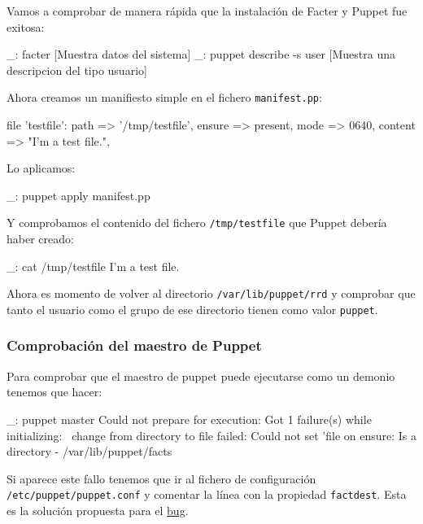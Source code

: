 Vamos a comprobar de manera rápida que la instalación de Facter y Puppet fue exitosa:

\begin{bashcode}
_: facter
[Muestra datos del sistema]
_: puppet describe -s user
[Muestra una descripcion del tipo usuario]
\end{bashcode}

Ahora creamos un manifiesto simple en el fichero \texttt{manifest.pp}:

\begin{rubycode}
file {'testfile':
  path    => '/tmp/testfile',
  ensure  => present,
  mode    => 0640,
  content => "I'm a test file.",
}
\end{rubycode}

Lo aplicamos:

\begin{bashcode}
_: puppet apply manifest.pp
\end{bashcode}

Y comprobamos el contenido del fichero \texttt{/tmp/testfile} que Puppet debería haber creado:

\begin{bashcode}
_: cat /tmp/testfile
I'm a test file.
\end{bashcode}

Ahora es momento de volver al directorio \texttt{/var/lib/puppet/rrd} y comprobar que tanto el usuario como el grupo de ese directorio tienen como valor \texttt{puppet}.


\subsubsection{Comprobación del maestro de Puppet}

Para comprobar que el maestro de puppet puede ejecutarse como un demonio tenemos que hacer:

\begin{bashcode}
_: puppet master
Could not prepare for execution: Got 1 failure(s) while initializing: \
change from directory to file failed: 
Could not set 'file on ensure: Is a directory - /var/lib/puppet/facts
\end{bashcode}

Si aparece este fallo tenemos que ir al fichero de configuración \texttt{/etc/puppet/puppet.conf} y comentar la línea con la propiedad \texttt{factdest}. Esta es la solución propuesta para el \href{https://projects.puppetlabs.com/issues/9491}{bug}.

